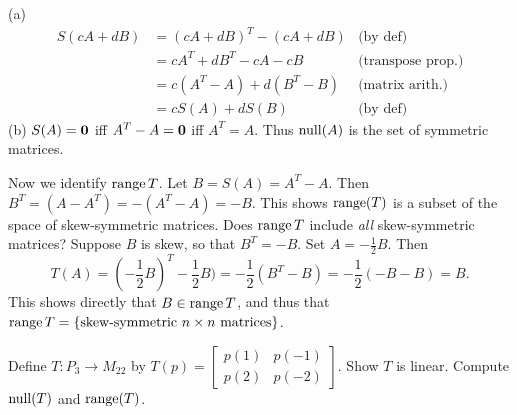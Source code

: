 \ee
\begin{solution}
\noindent 
(a) 
\begin{align*}
S(cA+dB)&=(cA+dB)^T-(cA+dB) &\text{(by def)}\\
&=cA^T+dB^T-cA-cB &\text{(transpose prop.)}\\
&=c(A^T-A)+d(B^T-B)&\text{(matrix arith.)}\\
&=cS(A)+dS(B) &\text{(by def)}
\end{align*}
\noindent
(b) $S(A)={\mathbf 0}$ iff $A^T-A={\mathbf 0}$ iff $A^T=A$. Thus $\operatorname{null}(A)$ is the set of symmetric matrices. 

\noindent
Now we identify $\operatorname{range} T$. Let $B=S(A)=A^T-A$. Then $B^T=(A-A^T)=-(A^T-A)=-B$. This shows $\operatorname{range}(T)$ is a subset of the space of skew-symmetric matrices. Does $\operatorname{range} T$ include {\em all } skew-symmetric matrices? Suppose $B$ is skew, so that $B^T=-B$. Set $A=-\frac{1}{2}B$. Then 
\[
T(A)=(-\frac{1}{2}B)^T-\frac{1}{2}B)=-\frac{1}{2}(B^T-B)=-\frac{1}{2}(-B-B)=B.
\]
This shows directly that $B\in \operatorname{range} T$, and thus that $\operatorname{range} T=\{\text{skew-symmetric $n\times n$ matrices}\}$. 

\end{solution}
\ii Define $T\colon P_3\rightarrow M_{22}$ by $T(p)=\begin{bmatrix}p(1)&p(-1)\\ p(2)&p(-2)\end{bmatrix}$. 
\bb
\ii Show $T$ is linear. 
\ii 
Compute $\operatorname{null}(T)$ and $\operatorname{range}(T)$. 

